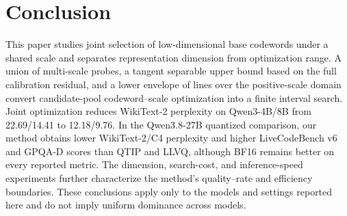 \section{Conclusion}

This paper studies joint selection of low-dimensional base codewords under a shared scale and separates representation dimension from optimization range. A union of multi-scale probes, a tangent separable upper bound based on the full calibration residual, and a lower envelope of lines over the positive-scale domain convert candidate-pool codeword--scale optimization into a finite interval search. Joint optimization reduces WikiText-2 perplexity on Qwen3-4B/8B from 22.69/14.41 to 12.18/9.76. In the Qwen3.8-27B quantized comparison, our method obtains lower WikiText-2/C4 perplexity and higher LiveCodeBench v6 and GPQA-D scores than QTIP and LLVQ, although BF16 remains better on every reported metric. The dimension, search-cost, and inference-speed experiments further characterize the method's quality--rate and efficiency boundaries. These conclusions apply only to the models and settings reported here and do not imply uniform dominance across models.
